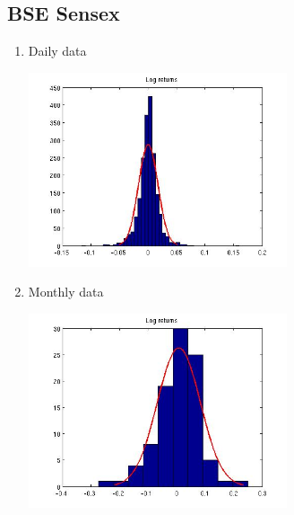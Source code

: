 \documentclass[12pt]{article}
\begin{document}
  \subsection*{BSE Sensex}
  \begin{enumerate}
    \item Daily data
      \begin{center}
        \includegraphics[width=3in]{sensexdailylr.jpg}
      \end{center}
    \item Monthly data
      \begin{center}
        \includegraphics[width=3in]{sensexmonthlylr.jpg}
      \end{center}
  \end{enumerate}
\end{document}
